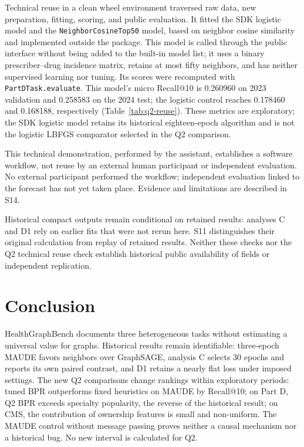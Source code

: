 Technical reuse in a clean wheel environment traversed raw data, new preparation, fitting, scoring, and public evaluation. It fitted the SDK logistic model and the \texttt{NeighborCosineTop50} model, based on neighbor cosine similarity and implemented outside the package. This model is called through the public interface without being added to the built-in model list; it uses a binary prescriber--drug incidence matrix, retains at most fifty neighbors, and has neither supervised learning nor tuning. Its scores were recomputed with \texttt{PartDTask.evaluate}. This model's micro Recall@10 is 0.260960 on 2023 validation and 0.258583 on the 2024 test; the logistic control reaches 0.178460 and 0.168188, respectively (Table~\ref{tab:q2-reuse}). These metrics are exploratory; the SDK logistic model retains its historical eighteen-epoch algorithm and is not the logistic LBFGS comparator selected in the Q2 comparison.

\begin{table}[!htbp]
\centering\small
\caption{Part D technical reuse check: completed fits and metrics recomputed with the public evaluator on 2023 validation and the 2024 test. The cosine model is implemented outside the package and is untuned; the SDK logistic model is not the Q2 comparator. These results constitute neither an additional tuned comparison nor human validation.}
\label{tab:q2-reuse}

\end{table}

This technical demonstration, performed by the assistant, establishes a software workflow, not reuse by an external human participant or independent evaluation. No external participant performed the workflow; independent evaluation linked to the forecast has not yet taken place. Evidence and limitations are described in S14.

Historical compact outputs remain conditional on retained results: analyses C and D1 rely on earlier fits that were not rerun here. S11 distinguishes their original calculation from replay of retained results. Neither these checks nor the Q2 technical reuse check establish historical public availability of fields or independent replication.

\section{Conclusion}

HealthGraphBench documents three heterogeneous tasks without estimating a universal value for graphs. Historical results remain identifiable: three-epoch MAUDE favors neighbors over GraphSAGE, analysis C selects 30 epochs and reports its own paired contrast, and D1 retains a nearly flat loss under imposed settings. The new Q2 comparisons change rankings within exploratory periods: tuned BPR outperforms fixed heuristics on MAUDE by Recall@10; on Part D, Q2 BPR exceeds specialty popularity, the reverse of the historical result; on CMS, the contribution of ownership features is small and non-uniform. The MAUDE control without message passing proves neither a causal mechanism nor a historical bug. No new interval is calculated for Q2.

